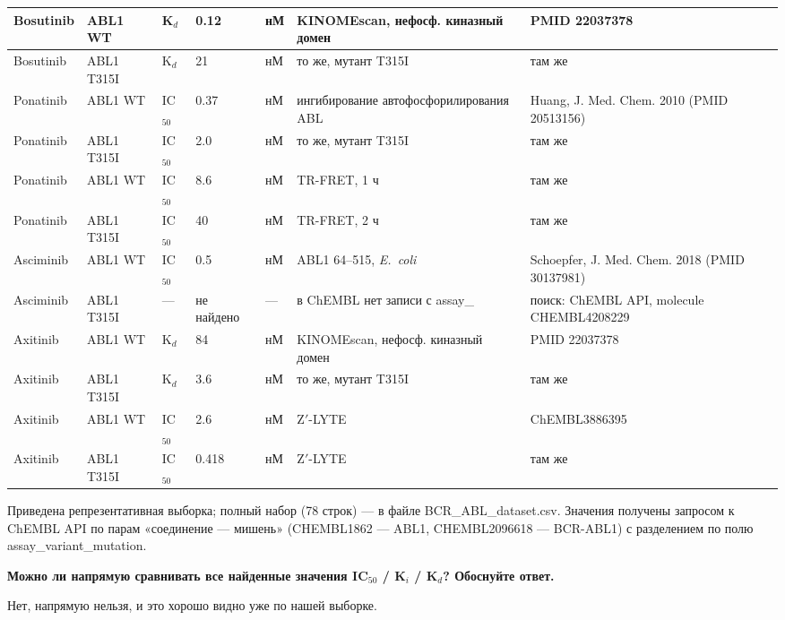 \documentclass[11pt,a4paper]{article}
\newcommand{\code}[1]{{\ttfamily #1}}
\begin{document}
\begin{center}
\begin{longtable}{|L{1.6cm}|L{1.5cm}|L{1.1cm}|L{1.2cm}|L{0.7cm}|L{2.9cm}|L{3.6cm}|}
\hline
Bosutinib & ABL1 WT & K$_d$ & 0.12 & нМ & KINOMEscan, нефосф. киназный домен &
PMID 22037378 \\
\hline
Bosutinib & ABL1 T315I & K$_d$ & 21 & нМ & то же, мутант T315I & там же \\
\hline
Ponatinib & ABL1 WT & IC$_{50}$ & 0.37 & нМ & ингибирование автофосфорилирования ABL &
Huang, J. Med. Chem. 2010 (PMID 20513156) \\
\hline
Ponatinib & ABL1 T315I & IC$_{50}$ & 2.0 & нМ & то же, мутант T315I & там же \\
\hline
Ponatinib & ABL1 WT & IC$_{50}$ & 8.6 & нМ & TR-FRET, 1 ч & там же \\
\hline
Ponatinib & ABL1 T315I & IC$_{50}$ & 40 & нМ & TR-FRET, 2 ч & там же \\
\hline
Asciminib & ABL1 WT & IC$_{50}$ & 0.5 & нМ & ABL1 64--515, \emph{E.~coli} &
Schoepfer, J. Med. Chem. 2018 (PMID 30137981) \\
\hline
Asciminib & ABL1 T315I & --- & не найдено & --- & в ChEMBL нет записи с
\code{assay\_}\allowbreak\code{variant\_}\allowbreak\code{mutation} & поиск: ChEMBL API, molecule CHEMBL4208229 \\
\hline
Axitinib & ABL1 WT & K$_d$ & 84 & нМ & KINOMEscan, нефосф. киназный домен &
PMID 22037378 \\
\hline
Axitinib & ABL1 T315I & K$_d$ & 3.6 & нМ & то же, мутант T315I & там же \\
\hline
Axitinib & ABL1 WT & IC$_{50}$ & 2.6 & нМ & Z$'$-LYTE & ChEMBL3886395 \\
\hline
Axitinib & ABL1 T315I & IC$_{50}$ & 0.418 & нМ & Z$'$-LYTE & там же \\
\hline
\end{longtable}
\end{center}

Приведена репрезентативная выборка; полный набор (78 строк) --- в файле
\code{BCR\_ABL\_dataset.csv}. Значения получены запросом к ChEMBL API по парам
«соединение --- мишень» (\code{CHEMBL1862} --- ABL1, \code{CHEMBL2096618} ---
BCR-ABL1) с разделением по полю \code{assay\_variant\_mutation}.

\textbf{Можно ли напрямую сравнивать все найденные значения IC$_{50}$ / K$_i$ / K$_d$?
Обоснуйте ответ.}

Нет, напрямую нельзя, и это хорошо видно уже по нашей выборке.
\end{document}
